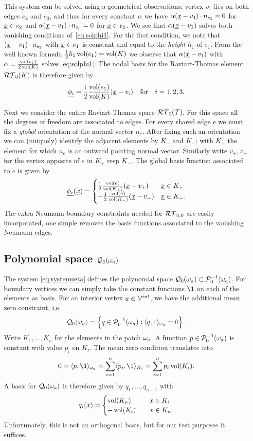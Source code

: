 \documentclass[thesis.tex]{subfiles}
\begin{document}
This system can be solved using a geometrical observations:
vertex $v_1$ lies on both edges $e_2$ and $e_3$, and thus for every constant $\alpha$  we have $\alpha(\underline{x} - v_1) \cdot n_{e_2} = 0$ for
$\underline{x} \in e_2$ and $\alpha(\underline{x} - v_1) \cdot  n_{e_3} = 0$ for $\underline{x} \in e_3$.
We see that $\alpha(\underline{x} - v_1)$ solves both vanishing conditions of~\eqref{eq:solphi1}.
For the first condition, we note that $(\underline{x} - v_1) \cdot n_{e_3}$ with $\underline{x} \in e_1$ is constant and equal to the \emph{height} $h_1$ 
of $e_1$. From the well known formula $\frac{1}{2} h_1 \operatorname{vol}(e_1) = \operatorname{vol}(K)$
we observe that $\alpha(\underline{x} - v_1)$ with $\alpha = \frac{\operatorname{vol}(e_1)}{2\operatorname{vol}(K)}$ solves \eqref{eq:solphi1}. 
The nodal basis for the Raviart-Thomas element $\mathcal{RT}_0(K)$ is therefore given by
\[
  \underline{\phi_i} = \frac{1}{2}\frac{\operatorname{vol}(e_1)}{\operatorname{vol}(K)}( \underline{x} - v_i) \quad \text{for} \quad i=1,2,3.
\]

Next we consider the entire Raviart-Thomas space $\mathcal{RT}_0(\mathcal{T})$. For this space all the degrees of freedom are associated
to edges. For every shared edge $e$ we must fix a \emph{global} orientation of the normal vector $n_e$.
After fixing such an orientation we can (uniquely) identify the adjacent elements by $K_+$ and $K_-$; with $K_+$ the element for which $n_e$
is an outward pointing normal vector. Similarly write $v_+, v_-$ for the vertex opposite of $e$ in $K_+$ resp $K_-$. The
global basis function associated to $e$ is given by
\begin{equation}
  \label{eq:basisrt0}
  \underline{\phi_e}(\underline{x}) = \begin{cases}
    \frac{1}{2}\frac{\operatorname{vol}(e)}{\operatorname{vol}(K_+)}( \underline{x} - v_+) & \underline{x} \in K_+\\
    - \frac{1}{2}\frac{\operatorname{vol}(e)}{\operatorname{vol}(K_-)}( \underline{x} - v_-) & \underline{x} \in K_-.
\end{cases}
\end{equation}
The extra Neumann boundary constraints needed for $\mathcal{RT}_{0,0}$ are easily incorporated, one simple removes the
basis functions associated to the vanishing Neumann edges. 
\subsection{Polynomial space $\mathcal{Q}_0(\omega_a)$}
The system \eqref{eq:systemzeta} defines the polynomial space $\mathcal{Q}_0(\omega_a) \subset \mathcal{P}_0^{-1}(\omega_a)$. For boundary
vertices we can simply take the constant functions $\1$ on each of the elements as basis. For an interior vertex $a \in \mathcal{V}^{int}$,
we have the additional mean zero constraint, i.e.
\[
  \mathcal{Q}_0(\omega_a) = \set{q \in \mathcal{P}_0^{-1}(\omega_a) :  \langle q,1 \rangle_{\omega_a} = 0}.
\]
Write $K_1,\dots, K_n$ for the elements in the patch $\omega_a$. A function $p \in \mathcal{P}_0^{-1}(\omega_a)$ is constant
with value $p_i$ on $K_i$. The mean zero condition translates into
\[
  0 = \ip{p,\1}_{\w_a} = \sum_{i =1}^n \ip{p_i, \1}_{K_i} = \sum_{i=1}^n p_i \vol(K_i).
\]
A basis for $\mathcal{Q}_0(\omega_a)$ is therefore given by $q_1, \dots, q_{n-1}$ with
\[
  q_i(x) = \begin{cases}
    \operatorname{vol}(K_n) & \quad x \in K_i\\
    -\operatorname{vol}(K_i) & \quad x \in K_n.
  \end{cases}
\]
Unfortunately, this is not an orthogonal basis, but for our test purposes it suffices.
\end{document}
